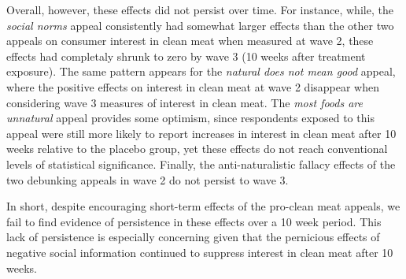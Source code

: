 \documentclass[12pt]{article}
\newcommand{\figurepath}[1]{../output/figures/#1}
\begin{document}
Overall, however, these effects did not persist over time. For instance, while, the \textit{social norms} appeal consistently had somewhat larger effects than the other two appeals on consumer interest in clean meat when measured at wave 2, these effects had completaly shrunk to zero by wave 3 (10 weeks after treatment exposure). The same pattern appears for the \textit{natural does not mean good} appeal, where the positive effects on interest in clean meat at wave 2 disappear when considering wave 3 measures of interest in clean meat. The \textit{most foods are unnatural} appeal provides some optimism, since respondents exposed to this appeal were still more likely to report increases in interest in clean meat after 10 weeks relative to the placebo group, yet these effects do not reach conventional levels of statistical significance. Finally, the anti-naturalistic fallacy effects of the two debunking appeals in wave 2 do not persist to wave 3.

In short, despite encouraging short-term effects of the pro-clean meat appeals, we fail to find evidence of persistence in these effects over a 10 week period. This lack of persistence is especially concerning given that the pernicious effects of negative social information continued to suppress interest in clean meat after 10 weeks.



\end{document}
